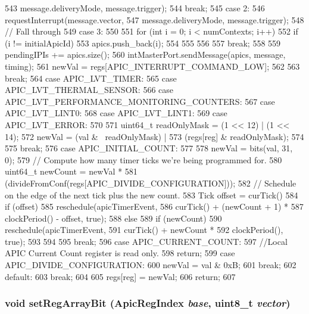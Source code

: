 \begin{DoxyCode}
{{{{543                         message.deliveryMode, message.trigger);
544                 break;
545               case 2:
546                 requestInterrupt(message.vector,
547                         message.deliveryMode, message.trigger);
548                 // Fall through
549               case 3:
550                 {
551                     for (int i = 0; i < numContexts; i++) {
552                         if (i != initialApicId) {
553                             apics.push_back(i);
554                         }
555                     }
556                 }
557                 break;
558             }
559             pendingIPIs += apics.size();
560             intMasterPort.sendMessage(apics, message, timing);
561             newVal = regs[APIC_INTERRUPT_COMMAND_LOW];
562         }
563         break;
564       case APIC_LVT_TIMER:
565       case APIC_LVT_THERMAL_SENSOR:
566       case APIC_LVT_PERFORMANCE_MONITORING_COUNTERS:
567       case APIC_LVT_LINT0:
568       case APIC_LVT_LINT1:
569       case APIC_LVT_ERROR:
570         {
571             uint64_t readOnlyMask = (1 << 12) | (1 << 14);
572             newVal = (val & ~readOnlyMask) |
573                      (regs[reg] & readOnlyMask);
574         }
575         break;
576       case APIC_INITIAL_COUNT:
577         {
578             newVal = bits(val, 31, 0);
579             // Compute how many timer ticks we're being programmed for.
580             uint64_t newCount = newVal *
581                 (divideFromConf(regs[APIC_DIVIDE_CONFIGURATION]));
582             // Schedule on the edge of the next tick plus the new count.
583             Tick offset = curTick() %
584             if (offset) {
585                 reschedule(apicTimerEvent,
586                            curTick() + (newCount + 1) *
587                            clockPeriod() - offset, true);
588             } else {
589                 if (newCount)
590                     reschedule(apicTimerEvent,
591                                curTick() + newCount *
592                                clockPeriod(), true);
593             }
594         }
595         break;
596       case APIC_CURRENT_COUNT:
597         //Local APIC Current Count register is read only.
598         return;
599       case APIC_DIVIDE_CONFIGURATION:
600         newVal = val & 0xB;
601         break;
602       default:
603         break;
604     }
605     regs[reg] = newVal;
606     return;
607 }
\end{DoxyCode}
\hypertarget{classX86ISA_1_1Interrupts_ac346555c2f6639d76b0d3730d0e216e2}{
\subsubsection[{setRegArrayBit}]{\setlength{\rightskip}{0pt plus 5cm}void setRegArrayBit ({\bf ApicRegIndex} {\em base}, \/  uint8\_\-t {\em vector})}}
\label{classX86ISA_1_1Interrupts_ac346555c2f6639d76b0d3730d0e216e2}



